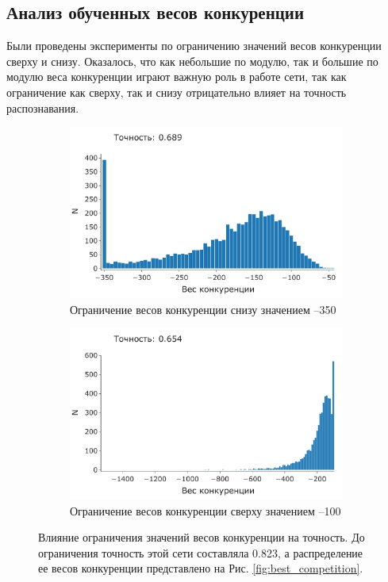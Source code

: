 \documentclass[a4paper]{article}
\begin{document}
\subsection{Анализ обученных весов конкуренции}
Были проведены эксперименты по ограничению значений весов конкуренции сверху и снизу. Оказалось, что как небольшие по модулю, так и большие по модулю веса конкуренции играют важную роль в работе сети, так как ограничение как сверху, так и снизу отрицательно влияет на точность распознавания.

\begin{figure}[H] 
\centering

\begin{subfigure}{0.45\textwidth}
    \includegraphics[width=\textwidth,keepaspectratio=true]{competition_distribution_clamp_low_ru.pdf}
    \caption{Ограничение весов конкуренции снизу значением --350} 
\end{subfigure}
\begin{subfigure}{0.45\textwidth}
    \includegraphics[width=\textwidth,keepaspectratio=true]{competition_distribution_clamp_high_ru.pdf}
    \caption{Ограничение весов конкуренции сверху значением --100}
\end{subfigure} 
\caption{Влияние ограничения значений весов конкуренции на точность. До ограничения точность этой сети составляла 0.823, а распределение ее весов конкуренции представлено на Рис. \ref{fig:best_competition}.}
\end{figure}
\end{document}
